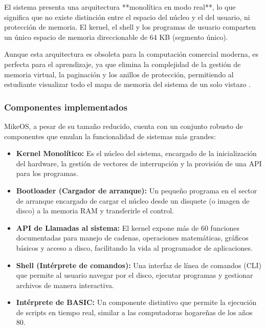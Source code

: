 El sistema presenta una arquitectura **monolítica en modo real**, lo que significa que no existe distinción entre el espacio del núcleo y el del usuario, ni protección de memoria. El kernel, el shell y los programas de usuario comparten un único espacio de memoria direccionable de 64 KB (segmento único).

Aunque esta arquitectura es obsoleta para la computación comercial moderna, es perfecta para el aprendizaje, ya que elimina la complejidad de la gestión de memoria virtual, la paginación y los anillos de protección, permitiendo al estudiante visualizar todo el mapa de memoria del sistema de un solo vistazo \cite{mikeos_purpose}.

\subsubsection{Componentes implementados}

MikeOS, a pesar de su tamaño reducido, cuenta con un conjunto robusto de componentes que emulan la funcionalidad de sistemas más grandes:

\begin{itemize}
    \item \textbf{Kernel Monolítico:} Es el núcleo del sistema, encargado de la inicialización del hardware, la gestión de vectores de interrupción y la provisión de una API para los programas.
    
    \item \textbf{Bootloader (Cargador de arranque):} Un pequeño programa en el sector de arranque encargado de cargar el núcleo desde un disquete (o imagen de disco) a la memoria RAM y transferirle el control.

    \item \textbf{API de Llamadas al sistema:} El kernel expone más de 60 funciones documentadas para manejo de cadenas, operaciones matemáticas, gráficos básicos y acceso a disco, facilitando la vida al programador de aplicaciones.

    \item \textbf{Shell (Intérprete de comandos):} Una interfaz de línea de comandos (CLI) que permite al usuario navegar por el disco, ejecutar programas y gestionar archivos de manera interactiva.

    \item \textbf{Intérprete de BASIC:} Un componente distintivo que permite la ejecución de scripts en tiempo real, similar a las computadoras hogareñas de los años 80.
\end{itemize}

